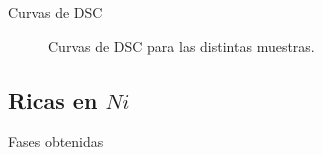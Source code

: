 \documentclass[11pt]{beamer}
\begin{document}
\begin{frame}{Curvas de DSC}
\begin{figure}[H]
				\caption{Curvas de DSC para las distintas muestras.}
				\label{DSCNiPoor}
			\end{figure}	
		\end{frame}
	\subsection{Ricas en $Ni$}	
		\begin{frame}{Fases obtenidas}
			\begin{figure}[H]
				 \\

\end{figure}
\end{frame}
\end{document}
